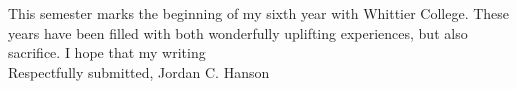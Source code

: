 \documentclass[../main.tex]{subfiles}
\begin{document}
This semester marks the beginning of my sixth year with Whittier College.  These years have been filled with both wonderfully uplifting experiences, but also sacrifice.  I hope that my writing 
\\
\vspace{0.15cm}
Respectfully submitted,
Jordan C. Hanson
\end{document}
